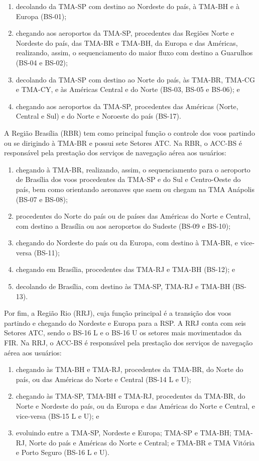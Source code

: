 \documentclass[
]{book}
\begin{document}
\begin{enumerate}
\def\labelenumi{\alph{enumi})}
\item
  decolando da TMA-SP com destino ao Nordeste do país, à TMA-BH e à Europa (BS-01);
\item
  chegando aos aeroportos da TMA-SP, procedentes das Regiões Norte e Nordeste do país, das TMA-BR e TMA-BH, da Europa e das Américas, realizando, assim, o sequenciamento do maior fluxo com destino a Guarulhos (BS-04 e BS-02);
\item
  decolando da TMA-SP com destino ao Norte do país, às TMA-BR, TMA-CG e TMA-CY, e às Américas Central e do Norte (BS-03, BS-05 e BS-06); e
\item
  chegando aos aeroportos da TMA-SP, procedentes das Américas (Norte, Central e Sul) e do Norte e Noroeste do país (BS-17).
\end{enumerate}

A Região Brasília (RBR) tem como principal função o controle dos voos partindo ou se dirigindo à TMA-BR e possui sete Setores ATC. Na RBR, o ACC-BS é responsável pela prestação dos serviços de navegação aérea aos usuários:

\begin{enumerate}
\def\labelenumi{\alph{enumi})}
\item
  chegando à TMA-BR, realizando, assim, o sequenciamento para o aeroporto de Brasília dos voos procedentes da TMA-SP e do Sul e Centro-Oeste do país, bem como orientando aeronaves que saem ou chegam na TMA Anápolis (BS-07 e BS-08);
\item
  procedentes do Norte do país ou de países das Américas do Norte e Central, com destino a Brasília ou aos aeroportos do Sudeste (BS-09 e BS-10);
\item
  chegando do Nordeste do país ou da Europa, com destino à TMA-BR, e vice-versa (BS-11);
\item
  chegando em Brasília, procedentes das TMA-RJ e TMA-BH (BS-12); e
\item
  decolando de Brasília, com destino às TMA-SP, TMA-RJ e TMA-BH (BS-13).
\end{enumerate}

Por fim, a Região Rio (RRJ), cuja função principal é a transição dos voos partindo e chegando do Nordeste e Europa para a RSP. A RRJ conta com seis Setores ATC, sendo o BS-16 L e o BS-16 U os setores mais movimentados da FIR. Na RRJ, o ACC-BS é responsável pela prestação dos serviços de navegação aérea aos usuários:

\begin{enumerate}
\def\labelenumi{\alph{enumi})}
\item
  chegando às TMA-BH e TMA-RJ, procedentes da TMA-BR, do Norte do país, ou das Américas do Norte e Central (BS-14 L e U);
\item
  chegando às TMA-SP, TMA-BH e TMA-RJ, procedentes da TMA-BR, do Norte e Nordeste do país, ou da Europa e das Américas do Norte e Central, e vice-versa (BS-15 L e U); e
\item
  evoluindo entre a TMA-SP, Nordeste e Europa; TMA-SP e TMA-BH; TMA-RJ, Norte do país e Américas do Norte e Central; e TMA-BR e TMA Vitória e Porto Seguro (BS-16 L e U).
\end{enumerate}
\end{document}
